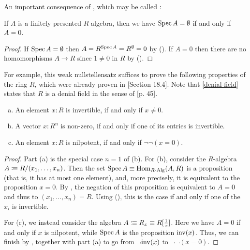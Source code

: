 An important consequence of , which may be called :

\begin{proposition}%
  \label{weak-nullstellensatz}
  If $A$ is a finitely presented $R$-algebra,
  then we have $\operatorname{Spec} A=\emptyset$ if and only if $A=0$.
\end{proposition}

\begin{proof}
  If $\operatorname{Spec} A = \emptyset$
  then $A = R^{\operatorname{Spec} A} = R^\emptyset = 0$
  by ().
  If $A = 0$
  then there are no homomorphisms $A \to R$
  since $1 \neq 0$ in $R$ by ().
\end{proof}

For example, this weak nullstellensatz suffices
to prove the following properties of the ring $R$,
which were already proven in
\cite{ingo-thesis}[Section 18.4].
Note that  \ref{denial-field} states that $R$ is a denial field in the sense of \cite{mines}[p. 45].

\begin{proposition}%
  \label{nilpotence-double-negation}\label{non-zero-invertible}\label{generalized-field-property}
  
  \begin{enumerate}[(a)]
  \item\label{denial-field} An element $x:R$ is invertible,
    if and only if $x\neq 0$.
  \item A vector $x:R^n$ is non-zero,
    if and only if one of its entries is invertible.
  \item An element $x:R$ is nilpotent,
    if and only if $\neg \neg (x=0)$.
  \end{enumerate}
\end{proposition}

\begin{proof}
  Part (a) is the special case $n = 1$ of (b).
  For (b),
  consider the $R$-algebra $A \vcentcolon\mspace{-1.2mu}\equiv R/(x_1, \dots, x_n)$.
  Then the set $\operatorname{Spec} A \equiv \mathrm{Hom}_{R\text{-}\mathrm{Alg}}(A, R)$
  is a proposition (that is, it has at most one element),
  and, more precisely, it is equivalent to the proposition $x = 0$.
  By ,
  the negation of this proposition is equivalent to $A = 0$
  and thus to $(x_1, \dots, x_n) = R$.
  Using (),
  this is the case if and only if one of the $x_i$ is invertible.

  For (c),
  we instead consider the algebra $A \vcentcolon\mspace{-1.2mu}\equiv R_x \equiv R[\frac{1}{x}]$.
  Here we have $A = 0$ if and only if $x$ is nilpotent,
  while $\operatorname{Spec} A$ is the proposition $\mathrm{inv}(x)$.
  Thus, we can finish by ,
  together with part (a) to go from $\lnot \mathrm{inv}(x)$ to $\lnot \lnot (x = 0)$.
\end{proof}

